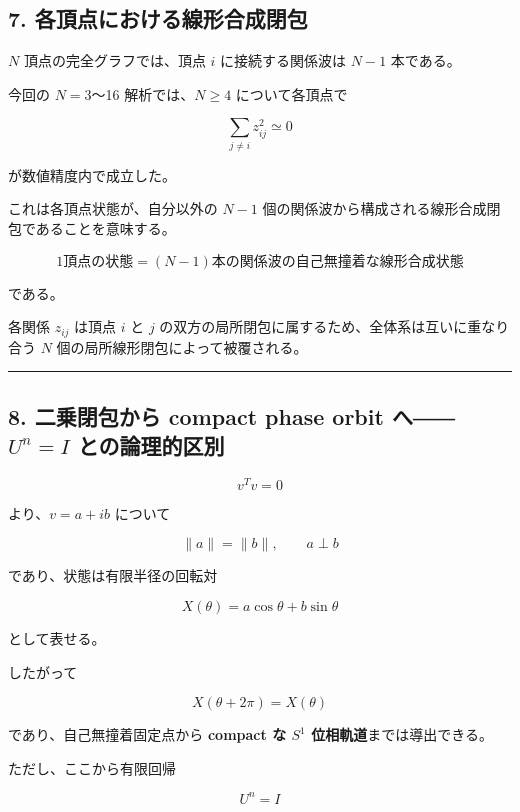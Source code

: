 \documentclass[
  a4paper,
]{ltjsarticle}
\begin{document}
\subsection{7.
各頂点における線形合成閉包}\label{ux5404ux9802ux70b9ux306bux304aux3051ux308bux7ddaux5f62ux5408ux6210ux9589ux5305}

\(N\) 頂点の完全グラフでは、頂点 \(i\) に接続する関係波は \(N-1\)
本である。

今回の \(N=3\)〜16 解析では、\(N\ge4\) について各頂点で

\[
\boxed{
\sum_{j\neq i} z_{ij}^2\simeq0
}
\]

が数値精度内で成立した。

これは各頂点状態が、自分以外の \(N-1\)
個の関係波から構成される線形合成閉包であることを意味する。

\[
\boxed{
\text{1頂点の状態}
=
(N-1)\text{本の関係波の自己無撞着な線形合成状態}
}
\]

である。

各関係 \(z_{ij}\) は頂点 \(i\) と \(j\)
の双方の局所閉包に属するため、全体系は互いに重なり合う \(N\)
個の局所線形閉包によって被覆される。

\begin{center}\rule{0.5\linewidth}{0.5pt}\end{center}

\subsection{\texorpdfstring{8. 二乗閉包から compact phase orbit
へ――\(U^n=I\)
との論理的区別}{8. 二乗閉包から compact phase orbit へ――U\^{}n=I との論理的区別}}\label{ux4e8cux4e57ux9589ux5305ux304bux3089-compact-phase-orbit-ux3078uni-ux3068ux306eux8ad6ux7406ux7684ux533aux5225}

\[
v^Tv=0
\]

より、\(v=a+ib\) について

\[
\|a\|=\|b\|,
\qquad
a\perp b
\]

であり、状態は有限半径の回転対

\[
X(\theta)=a\cos\theta+b\sin\theta
\]

として表せる。

したがって

\[
X(\theta+2\pi)=X(\theta)
\]

であり、自己無撞着固定点から \textbf{compact な \(S^1\)
位相軌道}までは導出できる。

ただし、ここから有限回帰

\[
U^n=I
\]
\end{document}
